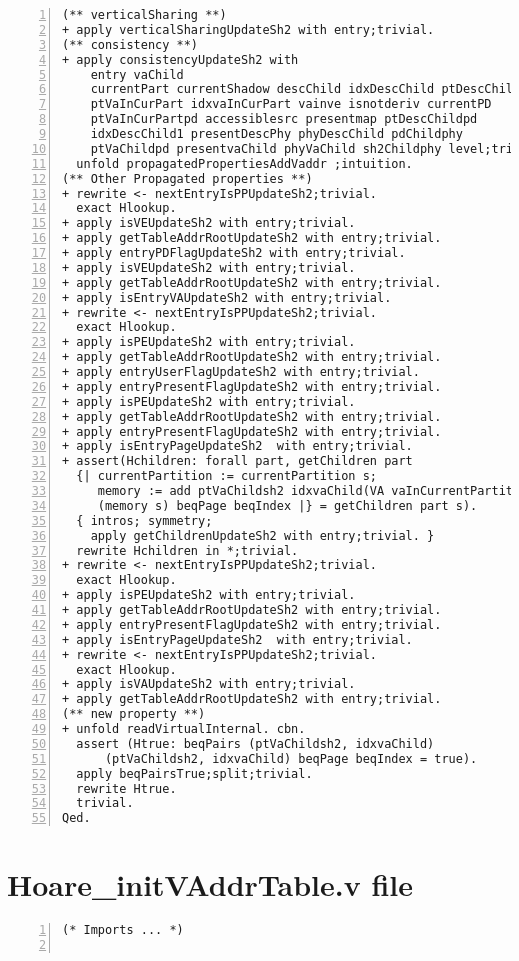 \begin{appendices}
\begin{lstlisting}[xleftmargin=-.1\textwidth,
xrightmargin=-.1\textwidth,
mathescape=true,numbers=left]
(** verticalSharing **)
+ apply verticalSharingUpdateSh2 with entry;trivial. 
(** consistency **)
+ apply consistencyUpdateSh2 with
    entry vaChild
    currentPart currentShadow descChild idxDescChild ptDescChild
    ptVaInCurPart idxvaInCurPart vainve isnotderiv currentPD
    ptVaInCurPartpd accessiblesrc presentmap ptDescChildpd 
    idxDescChild1 presentDescPhy phyDescChild pdChildphy 
    ptVaChildpd presentvaChild phyVaChild sh2Childphy level;trivial.
  unfold propagatedPropertiesAddVaddr ;intuition.
(** Other Propagated properties **)
+ rewrite <- nextEntryIsPPUpdateSh2;trivial.
  exact Hlookup.
+ apply isVEUpdateSh2 with entry;trivial.
+ apply getTableAddrRootUpdateSh2 with entry;trivial.
+ apply entryPDFlagUpdateSh2 with entry;trivial.
+ apply isVEUpdateSh2 with entry;trivial.
+ apply getTableAddrRootUpdateSh2 with entry;trivial.
+ apply isEntryVAUpdateSh2 with entry;trivial.
+ rewrite <- nextEntryIsPPUpdateSh2;trivial.
  exact Hlookup.
+ apply isPEUpdateSh2 with entry;trivial.
+ apply getTableAddrRootUpdateSh2 with entry;trivial.
+ apply entryUserFlagUpdateSh2 with entry;trivial.
+ apply entryPresentFlagUpdateSh2 with entry;trivial.
+ apply isPEUpdateSh2 with entry;trivial.
+ apply getTableAddrRootUpdateSh2 with entry;trivial.
+ apply entryPresentFlagUpdateSh2 with entry;trivial.
+ apply isEntryPageUpdateSh2  with entry;trivial.
+ assert(Hchildren: forall part, getChildren part
  {| currentPartition := currentPartition s;
     memory := add ptVaChildsh2 idxvaChild(VA vaInCurrentPartition) 
     (memory s) beqPage beqIndex |} = getChildren part s).
  { intros; symmetry;
    apply getChildrenUpdateSh2 with entry;trivial. } 
  rewrite Hchildren in *;trivial.
+ rewrite <- nextEntryIsPPUpdateSh2;trivial.
  exact Hlookup.
+ apply isPEUpdateSh2 with entry;trivial.
+ apply getTableAddrRootUpdateSh2 with entry;trivial.
+ apply entryPresentFlagUpdateSh2 with entry;trivial.
+ apply isEntryPageUpdateSh2  with entry;trivial.
+ rewrite <- nextEntryIsPPUpdateSh2;trivial.
  exact Hlookup.
+ apply isVAUpdateSh2 with entry;trivial.
+ apply getTableAddrRootUpdateSh2 with entry;trivial.
(** new property **)
+ unfold readVirtualInternal. cbn.
  assert (Htrue: beqPairs (ptVaChildsh2, idxvaChild) 
      (ptVaChildsh2, idxvaChild) beqPage beqIndex = true). 
  apply beqPairsTrue;split;trivial.
  rewrite Htrue.
  trivial.
Qed.
\end{lstlisting} \pagebreak

\section{Hoare\_initVAddrTable.v file} \label{initFile}
\begin{lstlisting}[xleftmargin=-.1\textwidth,
xrightmargin=-.1\textwidth,
mathescape=true,numbers=left]
(* Imports ... *)


\end{lstlisting}
\end{appendices}
